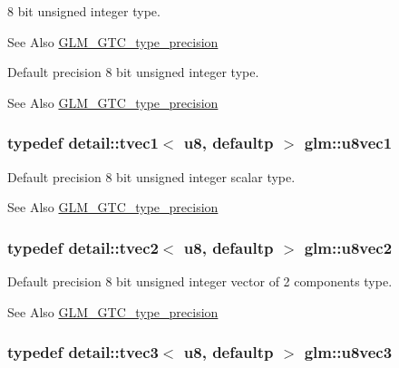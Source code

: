 8 bit unsigned integer type. \begin{DoxySeeAlso}{See Also}
\hyperlink{group__gtc__type__precision}{G\-L\-M\-\_\-\-G\-T\-C\-\_\-type\-\_\-precision}
\end{DoxySeeAlso}
Default precision 8 bit unsigned integer type. \begin{DoxySeeAlso}{See Also}
\hyperlink{group__gtc__type__precision}{G\-L\-M\-\_\-\-G\-T\-C\-\_\-type\-\_\-precision} 
\end{DoxySeeAlso}
\hypertarget{group__gtc__type__precision_gaf0155c700da11c0b5518a777d1f0cd23}{
\subsubsection[{u8vec1}]{\setlength{\rightskip}{0pt plus 5cm}typedef detail\-::tvec1$<$ u8, defaultp $>$ {\bf glm\-::u8vec1}}}\label{group__gtc__type__precision_gaf0155c700da11c0b5518a777d1f0cd23}
Default precision 8 bit unsigned integer scalar type. \begin{DoxySeeAlso}{See Also}
\hyperlink{group__gtc__type__precision}{G\-L\-M\-\_\-\-G\-T\-C\-\_\-type\-\_\-precision} 
\end{DoxySeeAlso}
\hypertarget{group__gtc__type__precision_gaa7ea171741c23b5bb2a3c91fe8c84e8a}{
\subsubsection[{u8vec2}]{\setlength{\rightskip}{0pt plus 5cm}typedef detail\-::tvec2$<$ u8, defaultp $>$ {\bf glm\-::u8vec2}}}\label{group__gtc__type__precision_gaa7ea171741c23b5bb2a3c91fe8c84e8a}
Default precision 8 bit unsigned integer vector of 2 components type. \begin{DoxySeeAlso}{See Also}
\hyperlink{group__gtc__type__precision}{G\-L\-M\-\_\-\-G\-T\-C\-\_\-type\-\_\-precision} 
\end{DoxySeeAlso}
\hypertarget{group__gtc__type__precision_ga3b4624ecd0485fe5143f956864e7934e}{
\subsubsection[{u8vec3}]{\setlength{\rightskip}{0pt plus 5cm}typedef detail\-::tvec3$<$ u8, defaultp $>$ {\bf glm\-::u8vec3}}}\label{group__gtc__type__precision_ga3b4624ecd0485fe5143f956864e7934e}

